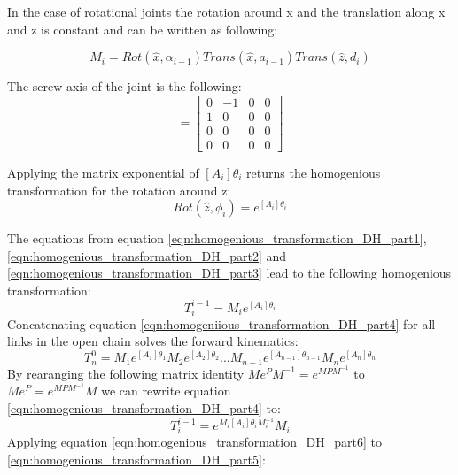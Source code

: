 \documentclass{tpk4170report}
\begin{document}
In the case of rotational joints the rotation around x and the translation along x and z is constant and can be written as following: 

\begin{equation}
  M_{i} = Rot(\hat{x}, \alpha_{i-1}) Trans(\hat{x}, a_{i-1}) Trans(\hat{z}, d_{i})
  \label{eqn:homogenious_transformation_DH_part1}
\end{equation}

The screw axis of the joint is the following: 
\begin{equation}
  [A_{i}]
  = 
  \begin{bmatrix}
    0 & -1 & 0 & 0\\
    1 & 0 & 0 & 0\\
    0 & 0 & 0 & 0\\
    0 & 0 & 0 & 0
  \end{bmatrix}
  \label{eqn:homogenious_transformation_DH_part2}
\end{equation}

Applying the matrix exponential of \([A_{i}]\theta_{i}\) returns the homogenious transformation for the rotation around z:
\begin{equation}
  Rot(\hat{z}, \phi_{i}) = e^{[A_{i}]\theta_{i}}
  \label{eqn:homogenious_transformation_DH_part3}
\end{equation}

The equations from equation \ref{eqn:homogenious_transformation_DH_part1}, \ref{eqn:homogenious_transformation_DH_part2} and \ref{eqn:homogenious_transformation_DH_part3} lead to the following homogenious transformation:
\begin{equation}
  T_{i}^{i-1} = M_{i}e^{[A_{i}]\theta_{i}}
  \label{eqn:homogenious_transformation_DH_part4}
\end{equation}
Concatenating equation \ref{eqn:homogeniious_transformation_DH_part4} for all links in the open chain solves the forward kinematics: 
\begin{equation}
  T_{n}^{0} = M_{1}e^{[A_{1}]\theta_{1}} M_{2}e^{[A_{2}]\theta_{2}} ... M_{n-1}e^{[A_{n-1}]\theta_{n-1}} M_{n}e^{[A_{n}]\theta_{n}}
  \label{eqn:homogenious_transformation_DH_part5}
\end{equation}
By rearanging the following matrix identity \(M e^{P} M^{-1} = e^{MPM^{-1}}\) to \(M e^{P} = e^{MPM^{-1}} M\) we can rewrite equation \ref{eqn:homogenious_transformation_DH_part4} to:
\begin{equation}
  T_{i}^{i-1} = e^{M_{i}[A_{i}]\theta_{i}M_{i}^{-1}}M_{i}
  \label{eqn:homogenious_transformation_DH_part6}
\end{equation}
Applying equation \ref{eqn:homogenious_transformation_DH_part6} to \ref{eqn:homogenious_transformation_DH_part5}:
\end{document}
